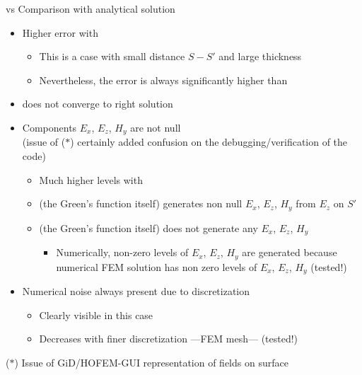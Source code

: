 \begin{frame}[allowframebreaks]{{\GreenD} vs {\GreenT}}{Comparison
    with analytical solution}
    \begin{itemize}
    \item Higher error with {\GreenT}
      \begin{itemize}
      \item This is a case with small distance $S-S'$ and large thickness
      \item Nevertheless, the error is always significantly higher
        than {\GreenD}
      \end{itemize}
    \item {\GreenT} does not converge to right solution
    \item Components $E_x$, $E_z$, $H_y$ are not null \\
      \footnotesize{(issue of \alert{($\ast$)} certainly added confusion on the
      debugging/verification of the code)}
      \begin{itemize}
      \item Much higher levels with {\GreenT}
      \item {\GreenT} (the Green's function itself) generates non null
        $E_x$, $E_z$, $H_y$ from $E_z$ on $S'$
      \item {\GreenD} (the Green's function itself) does not generate
        any $E_x$, $E_z$, $H_y$
        \begin{itemize}
        \item Numerically, non-zero levels of $E_x$, $E_z$, $H_y$ are
          generated because numerical FEM solution has non zero levels of
          $E_x$, $E_z$, $H_y$ (tested!)
        \end{itemize}
      \end{itemize}
    \item Numerical noise always present  due to discretization 
      \begin{itemize}
      \item Clearly visible in this case
      \item Decreases with finer discretization ---FEM mesh--- (tested!)
      \end{itemize}
    \end{itemize}
    
    {\footnotesize \alert{($\ast$)} Issue of GiD/HOFEM-GUI representation of fields on surface}
  
\end{frame}



